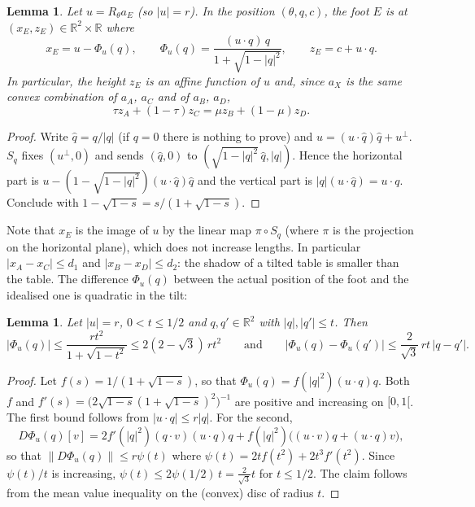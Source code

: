 \documentclass[a4paper,11pt,twoside,leqno]{article}
\newtheorem{lem}[teo]{Lemma}
\newcommand{\rr}[0]{\ensuremath{\mathbb{R}}}
\numberwithin{equation}{section}
\begin{document}
\begin{lem}\label{lem-coord}
Let $u = R_\theta a_E$ (so $|u| = r$). In the position $(\theta,q,c)$, the foot $E$ is at $(x_E, z_E) \in \rr^2 \times \rr$ where
\[
x_E = u - \Phi_u(q),
\qquad
\Phi_u(q) = \frac{(u \cdot q)\, q}{1 + \sqrt{1 - |q|^2}},
\qquad
z_E = c + u \cdot q.
\]
In particular, the height $z_E$ is an affine function of $u$ and, since $a_X$ is the same convex combination of $a_A$, $a_C$ and of $a_B$, $a_D$,
\begin{equation}\label{eq-plane}
\tau z_A + (1-\tau) z_C = \mu z_B + (1-\mu) z_D.
\end{equation}
\end{lem}
\begin{proof}
Write $\hat q = q/|q|$ (if $q = 0$ there is nothing to prove) and $u = (u \cdot \hat q) \hat q + u^\perp$. $S_q$ fixes $(u^\perp,0)$ and sends $(\hat q,0)$ to $(\sqrt{1-|q|^2}\, \hat q, |q|)$. Hence the horizontal part is $u - (1- \sqrt{1-|q|^2})(u \cdot \hat q) \hat q$ and the vertical part is $|q|(u \cdot \hat q) = u \cdot q$. Conclude with $1 - \sqrt{1-s} = s/(1+\sqrt{1-s})$.
\end{proof}

Note that $x_E$ is the image of $u$ by the linear map $\pi \circ S_q$ (where $\pi$ is the projection on the horizontal plane), which does not increase lengths. In particular $|x_A - x_C| \leq d_1$ and $|x_B - x_D| \leq d_2$: the shadow of a tilted table is smaller than the table. The difference $\Phi_u(q)$ between the actual position of the foot and the idealised one is quadratic in the tilt:

\begin{lem}\label{lem-phi}
Let $|u| = r$, $0 < t \leq 1/2$ and $q,q' \in \rr^2$ with $|q|, |q'| \leq t$. Then
\[
|\Phi_u(q)| \leq \frac{r t^2}{1+\sqrt{1-t^2}} \leq 2(2-\sqrt{3})\, r t^2
\qquad \text{and} \qquad
|\Phi_u(q) - \Phi_u(q')| \leq \frac{2}{\sqrt{3}}\, r t \, |q-q'|.
\]
\end{lem}
\begin{proof}
Let $f(s) = 1/(1+\sqrt{1-s})$, so that $\Phi_u(q) = f(|q|^2) (u \cdot q) q$. Both $f$ and $f'(s) = \big(2\sqrt{1-s}(1+\sqrt{1-s})^2\big)^{-1}$ are positive and increasing on $[0,1[$. The first bound follows from $|u \cdot q| \leq r|q|$. For the second,
\[
D\Phi_u(q)[v] = 2 f'(|q|^2) (q\cdot v)(u \cdot q) q + f(|q|^2)\big( (u \cdot v) q + (u \cdot q) v \big),
\]
so that $\|D\Phi_u(q)\| \leq r \psi(t)$ where $\psi(t) = 2 t f(t^2) + 2 t^3 f'(t^2)$. Since $\psi(t)/t$ is increasing, $\psi(t) \leq 2 \psi(1/2)\, t = \frac{2}{\sqrt{3}} t$ for $t \leq 1/2$. The claim follows from the mean value inequality on the (convex) disc of radius $t$.
\end{proof}
\end{document}
